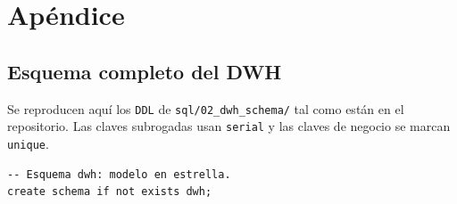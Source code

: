 \chapter{Apéndice}
\label{ch:apendice}

\section{Esquema completo del DWH}
\label{ap:ddl}

Se reproducen aquí los \texttt{DDL} de \texttt{sql/02\_dwh\_schema/} tal
como están en el repositorio. Las claves subrogadas usan \texttt{serial}
y las claves de negocio se marcan \texttt{unique}.

\begin{lstlisting}[language=SQLpostgres,
  caption={\texttt{sql/02\_dwh\_schema/00\_create\_schema.sql}: creación
  del esquema \texttt{dwh}.},
  label={lst:ap-create-schema}]
-- Esquema dwh: modelo en estrella.
create schema if not exists dwh;
\end{lstlisting}

